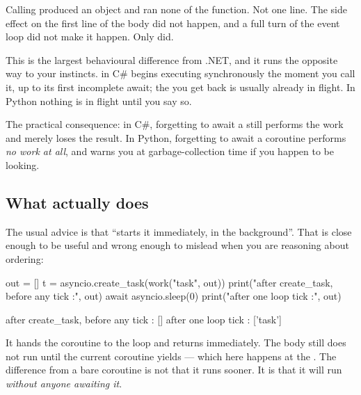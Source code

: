 Calling  produced an object and ran none of the function. Not one
line. The side effect on the first line of the body did not happen, and a full
turn of the event loop did not make it happen. Only  did.

\begin{dotnetbox}
This is the largest behavioural difference from .NET, and it runs the opposite
way to your instincts.  in C\# begins executing
synchronously the moment you call it, up to its first incomplete await; the
 you get back is usually already in flight. In Python nothing is in
flight until you say so.

The practical consequence: in C\#, forgetting to await a  still
performs the work and merely loses the result. In Python, forgetting to await a
coroutine performs \emph{no work at all}, and warns you at garbage-collection
time if you happen to be looking.
\end{dotnetbox}

\subsection{What \texorpdfstring{}{create-task} actually does}
\label{sec:create-task}

The usual advice is that  ``starts it immediately, in the
background''. That is close enough to be useful and wrong enough to mislead when
you are reasoning about ordering:

\begin{python}[caption={\code{create\_task} schedules; it does not execute}, label={lst:create-task}]
out = []
t = asyncio.create_task(work("task", out))
print("after create_task, before any tick :", out)
await asyncio.sleep(0)
print("after one loop tick                :", out)
\end{python}

\begin{console}
after create_task, before any tick : []
after one loop tick                : ['task']
\end{console}

It hands the coroutine to the loop and returns immediately. The body still does
not run until the current coroutine yields --- which here happens at the
. The difference from a bare coroutine is not that it runs
sooner. It is that it will run \emph{without anyone awaiting it}.

